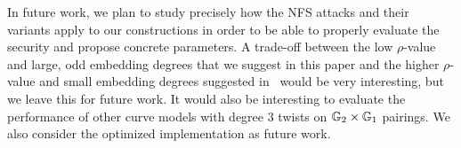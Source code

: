 In future work,
we plan to study precisely how the NFS attacks and their variants apply to our constructions in order to be able to
properly evaluate the security and propose concrete parameters.
A trade-off between the low $\rho$-value and large, odd embedding degrees that we suggest in this paper and the higher $\rho$-value and small embedding degrees suggested in~\cite{2018/FK} would be very interesting, but we leave this for future work.
It would also be interesting to evaluate the performance of other curve models with degree 3 twists on $\mathbb{G}_{2} \times \mathbb{G}_{1}$ pairings.
We also consider the optimized implementation as future work.





